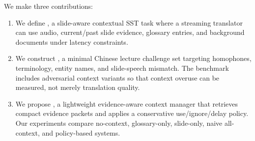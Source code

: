 We make three contributions:
\begin{enumerate}[leftmargin=*]
    \item We define \taskname, a slide-aware contextual SST task where a streaming translator can use audio, current/past slide evidence, glossary entries, and background documents under latency constraints.
    \item We construct \datasetname, a minimal Chinese lecture challenge set targeting homophones, terminology, entity names, and slide-speech mismatch.  The benchmark includes adversarial context variants so that context overuse can be measured, not merely translation quality.
    \item We propose \policyname, a lightweight evidence-aware context manager that retrieves compact evidence packets and applies a conservative use/ignore/delay policy.  Our experiments compare no-context, glossary-only, slide-only, naive all-context, and policy-based systems.
\end{enumerate}

